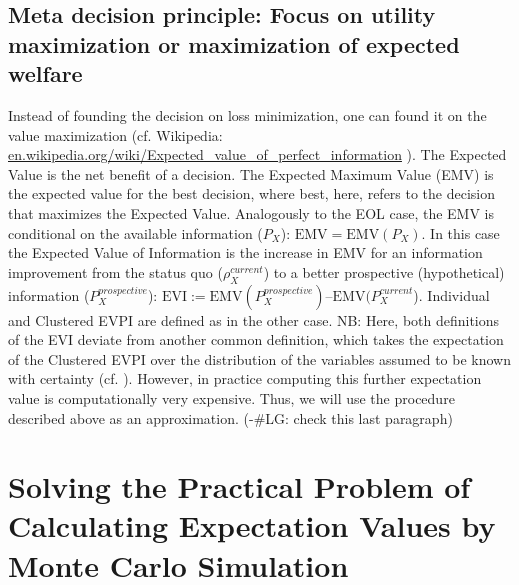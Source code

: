 \documentclass[a4paper,10pt,twoside,pagesize,abstracton]{scrartcl}
\newcommand{\EVI}{\mathrm{EVI}} %
\theoremstyle{plain}%
\theoremstyle{definition}
\theoremstyle{remark}
\begin{document}
\subsection{Meta decision principle: Focus on utility maximization or maximization of expected welfare}
Instead of founding the decision on loss minimization, one can found it on the value maximization (cf. Wikipedia: \url{en.wikipedia.org/wiki/Expected_value_of_perfect_information} ).  The Expected Value is the net benefit of a decision. The Expected Maximum Value (EMV) is the expected value for the best decision, where best, here, refers to the decision that maximizes the Expected Value. Analogously to the EOL case, the EMV is conditional on the available information ($P_X$): $\mathrm{EMV} = \mathrm{EMV}(P_X)$. In this case the Expected Value of Information is the increase in EMV for an information improvement from the status quo ($\rho_X^{current}$) to a better prospective (hypothetical)  information ($P_X^{prospective}$): $\EVI:= \mathrm{EMV}(P_X^{prospective}) – \mathrm{EMV} (P_X^{current}$). Individual and Clustered EVPI are defined as in the other case. 
NB: Here, both definitions of the EVI deviate from another common definition, which takes the expectation of  the Clustered EVPI over the distribution of the variables assumed to be known with certainty (cf. \citet{JeffreyPannell2013}). However, in practice computing this further expectation value is computationally very expensive. Thus, we will use the procedure described above as an approximation. (-\#LG: check this last paragraph)

\section{Solving the Practical Problem of Calculating Expectation Values by Monte Carlo Simulation}
\end{document}
